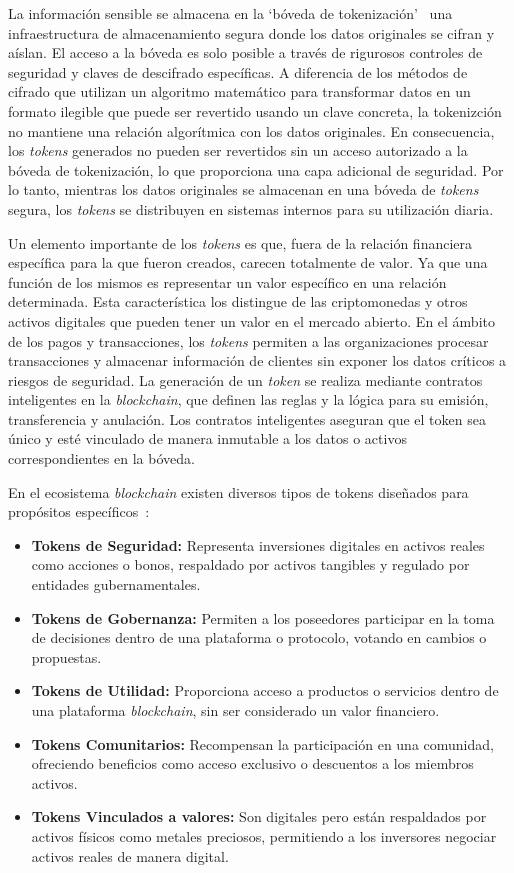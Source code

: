 La información sensible se almacena en la `bóveda de tokenización'~\cite{bóvedaTokenización} una infraestructura de almacenamiento segura donde los datos originales se cifran y aíslan. El acceso a la bóveda es solo posible a través de rigurosos controles de seguridad y claves de descifrado específicas.
A diferencia de los métodos de cifrado que utilizan un algoritmo matemático para transformar datos en un formato ilegible que puede ser revertido usando un clave concreta, la tokenizción no mantiene una relación algorítmica con los datos originales. En consecuencia, los \textit{tokens} generados no pueden ser revertidos sin un acceso autorizado a la bóveda de tokenización, lo que proporciona una capa adicional de seguridad.
Por lo tanto, mientras los datos originales se almacenan en una bóveda de \textit{tokens} segura, los \textit{tokens} se distribuyen en sistemas internos para su utilización diaria.

Un elemento importante de los \textit{tokens} es que, fuera de la relación financiera específica para la que fueron creados, carecen totalmente de valor. Ya que una función de los mismos es representar un valor específico en una relación determinada. Esta característica los distingue de las criptomonedas y otros activos digitales que pueden tener un valor en el mercado abierto.
En el ámbito de los pagos y transacciones, los \textit{tokens} permiten a las organizaciones procesar transacciones y almacenar información de clientes sin exponer los datos críticos a riesgos de seguridad.
La generación de un \textit{token} se realiza mediante contratos inteligentes en la \textit{blockchain}, que definen las reglas y la lógica para su emisión, transferencia y anulación. Los contratos inteligentes aseguran que el token sea único y esté vinculado de manera inmutable a los datos o activos correspondientes en la bóveda.

En el ecosistema \textit{blockchain} existen diversos tipos de tokens diseñados para propósitos específicos~\cite{tiposToken}:

\begin{itemize}
\item \textbf{Tokens de Seguridad:} Representa inversiones digitales en activos reales como acciones o bonos, respaldado por activos tangibles y regulado por entidades gubernamentales.
\item \textbf{Tokens de Gobernanza:} Permiten a los poseedores participar en la toma de decisiones dentro de una plataforma o protocolo, votando en cambios o propuestas.
\item \textbf{Tokens de Utilidad:} Proporciona acceso a productos o servicios dentro de una plataforma \textit{blockchain}, sin ser considerado un valor financiero.
\item \textbf{Tokens Comunitarios:} Recompensan la participación en una comunidad, ofreciendo beneficios como acceso exclusivo o descuentos a los miembros activos.
\item \textbf{Tokens Vinculados a valores:} Son digitales pero están respaldados por activos físicos como metales preciosos, permitiendo a los inversores negociar activos reales de manera digital.

\end{itemize}

